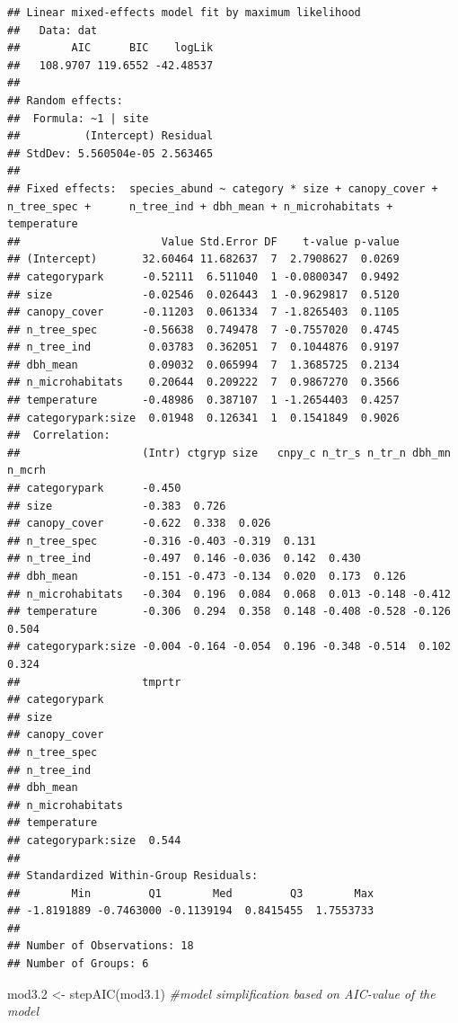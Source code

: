 \documentclass[
]{article}
\newenvironment{Shaded}{\begin{snugshade}}{\end{snugshade}}
\newcommand{\CommentTok}[1]{\textcolor[rgb]{0.56,0.35,0.01}{\textit{#1}}}
\newcommand{\FloatTok}[1]{\textcolor[rgb]{0.00,0.00,0.81}{#1}}
\newcommand{\FunctionTok}[1]{\textcolor[rgb]{0.00,0.00,0.00}{#1}}
\newcommand{\NormalTok}[1]{#1}
\newcommand{\OtherTok}[1]{\textcolor[rgb]{0.56,0.35,0.01}{#1}}
\begin{document}
\begin{verbatim}
## Linear mixed-effects model fit by maximum likelihood
##   Data: dat 
##        AIC      BIC    logLik
##   108.9707 119.6552 -42.48537
## 
## Random effects:
##  Formula: ~1 | site
##          (Intercept) Residual
## StdDev: 5.560504e-05 2.563465
## 
## Fixed effects:  species_abund ~ category * size + canopy_cover + n_tree_spec +      n_tree_ind + dbh_mean + n_microhabitats + temperature 
##                      Value Std.Error DF    t-value p-value
## (Intercept)       32.60464 11.682637  7  2.7908627  0.0269
## categorypark      -0.52111  6.511040  1 -0.0800347  0.9492
## size              -0.02546  0.026443  1 -0.9629817  0.5120
## canopy_cover      -0.11203  0.061334  7 -1.8265403  0.1105
## n_tree_spec       -0.56638  0.749478  7 -0.7557020  0.4745
## n_tree_ind         0.03783  0.362051  7  0.1044876  0.9197
## dbh_mean           0.09032  0.065994  7  1.3685725  0.2134
## n_microhabitats    0.20644  0.209222  7  0.9867270  0.3566
## temperature       -0.48986  0.387107  1 -1.2654403  0.4257
## categorypark:size  0.01948  0.126341  1  0.1541849  0.9026
##  Correlation: 
##                   (Intr) ctgryp size   cnpy_c n_tr_s n_tr_n dbh_mn n_mcrh
## categorypark      -0.450                                                 
## size              -0.383  0.726                                          
## canopy_cover      -0.622  0.338  0.026                                   
## n_tree_spec       -0.316 -0.403 -0.319  0.131                            
## n_tree_ind        -0.497  0.146 -0.036  0.142  0.430                     
## dbh_mean          -0.151 -0.473 -0.134  0.020  0.173  0.126              
## n_microhabitats   -0.304  0.196  0.084  0.068  0.013 -0.148 -0.412       
## temperature       -0.306  0.294  0.358  0.148 -0.408 -0.528 -0.126  0.504
## categorypark:size -0.004 -0.164 -0.054  0.196 -0.348 -0.514  0.102  0.324
##                   tmprtr
## categorypark            
## size                    
## canopy_cover            
## n_tree_spec             
## n_tree_ind              
## dbh_mean                
## n_microhabitats         
## temperature             
## categorypark:size  0.544
## 
## Standardized Within-Group Residuals:
##        Min         Q1        Med         Q3        Max 
## -1.8191889 -0.7463000 -0.1139194  0.8415455  1.7553733 
## 
## Number of Observations: 18
## Number of Groups: 6
\end{verbatim}

\begin{Shaded}
\begin{Highlighting}[]
\NormalTok{mod3}\FloatTok{.2} \OtherTok{\textless{}{-}} \FunctionTok{stepAIC}\NormalTok{(mod3}\FloatTok{.1}\NormalTok{) }\CommentTok{\#model simplification based on AIC{-}value of the model}
\end{Highlighting}
\end{Shaded}
\end{document}
